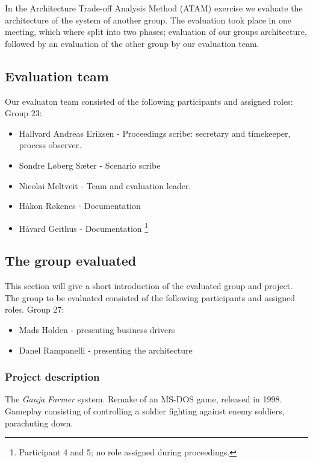 In the Architecture Trade-off Analysis Method (ATAM) exercise we evaluate the architecture of the system of another group. The evaluation took place in one meeting, which where split into two phases; evaluation of our groups architecture, followed by an evaluation of the other group by our evaluation team.

\subsection{Evaluation team}
Our evaluaton team consisted of the following participants and assigned roles: \\Group 23: 
\begin{itemize}
    \item Hallvard Andreas Eriksen - Proceedings scribe: secretary and timekeeper, process observer.
    \item Sondre Løberg Sæter - Scenario scribe
    \item Nicolai Meltveit - Team and evaluation leader.
    \item Håkon Røkenes - Documentation 
    \item Håvard Geithus - Documentation \footnote{Participant 4 and 5; no role assigned during proceedings.}
\end{itemize}

\subsection{The group evaluated}
This section will give a short introduction of the evaluated group and project.
The group to be evaluated consisted of the following participants and assigned roles.
Group 27:
\begin{itemize}
  \item Mads Holden - presenting business drivers
  \item Danel Rampanelli - presenting the architecture
\end{itemize}

\subsubsection{Project description}
The \emph{Ganja Farmer} system. Remake of an MS-DOS game, released in 1998. Gameplay consisting of controlling a soldier fighting against enemy soldiers, parachuting down.


